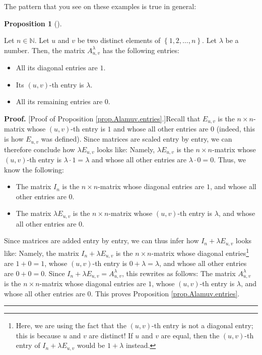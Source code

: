 \documentclass[numbers=enddot,12pt,final,onecolumn,notitlepage]{scrartcl}%
\theoremstyle{definition}
\newtheorem{prop}[theo]{Proposition}
\newenvironment{proposition}[1][]
{\begin{prop}[#1]\begin{leftbar}}
{\end{leftbar}\end{prop}}
\newenvironment{proof}[1][Proof]{\noindent\textbf{#1.} }{\ \rule{0.5em}{0.5em}}
\begin{document}
The pattern that you see on these examples is true in general:

\begin{proposition}
\label{prop.Alamuv.entries}Let $n\in\mathbb{N}$. Let $u$ and $v$ be two
distinct elements of $\left\{  1,2,\ldots,n\right\}  $. Let $\lambda$ be a
number. Then, the matrix $A_{u,v}^{\lambda}$ has the following entries:

\begin{itemize}
\item All its diagonal entries are $1$.

\item Its $\left(  u,v\right)  $-th entry is $\lambda$.

\item All its remaining entries are $0$.
\end{itemize}
\end{proposition}

\begin{proof}
[Proof of Proposition \ref{prop.Alamuv.entries}.]Recall that $E_{u,v}$ is the
$n\times n$-matrix whose $\left(  u,v\right)  $-th entry is $1$ and whose all
other entries are $0$ (indeed, this is how $E_{u,v}$ was defined). Since
matrices are scaled entry by entry, we can therefore conclude how $\lambda
E_{u,v}$ looks like: Namely, $\lambda E_{u,v}$ is the $n\times n$-matrix whose
$\left(  u,v\right)  $-th entry is $\lambda\cdot1=\lambda$ and whose all other
entries are $\lambda\cdot0=0$. Thus, we know the following:

\begin{itemize}
\item The matrix $I_{n}$ is the $n\times n$-matrix whose diagonal entries are
$1$, and whose all other entries are $0$.

\item The matrix $\lambda E_{u,v}$ is the $n\times n$-matrix whose $\left(
u,v\right)  $-th entry is $\lambda$, and whose all other entries are $0$.
\end{itemize}

Since matrices are added entry by entry, we can thus infer how $I_{n}+\lambda
E_{u,v}$ looks like: Namely, the matrix $I_{n}+\lambda E_{u,v}$ is the
$n\times n$-matrix whose diagonal entries\footnote{Here, we are using the fact
that the $\left(  u,v\right)  $-th entry is not a diagonal entry; this is
because $u$ and $v$ are distinct! If $u$ and $v$ are equal, then the $\left(
u,v\right)  $-th entry of $I_{n}+\lambda E_{u,v}$ would be $1+\lambda$
instead.} are $1+0=1$, whose $\left(  u,v\right)  $-th entry is $0+\lambda
=\lambda$, and whose all other entries are $0+0=0$. Since $I_{n}+\lambda
E_{u,v}=A_{u,v}^{\lambda}$, this rewrites as follows: The matrix
$A_{u,v}^{\lambda}$ is the $n\times n$-matrix whose diagonal entries are $1$,
whose $\left(  u,v\right)  $-th entry is $\lambda$, and whose all other
entries are $0$. This proves Proposition \ref{prop.Alamuv.entries}.
\end{proof}
\end{document}
